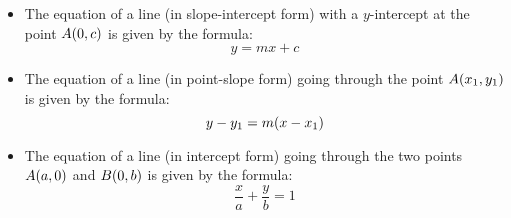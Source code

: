 \documentclass[12pt,a4paper,titlepage]{article}
\DeclarePairedDelimiter {\pars}  {  (      }     {  )      }
\begin{document}
\begin{SummaryBox}[title=Linear coordinate geometry, breakable]
                \begin{SummaryExtensionBox}[title=Equation of a line]
                    \begin{itemize}[leftmargin=*]
                        \item The equation of a line (in slope-intercept form) with a $y$-intercept at the point $A\pars*{0,c}$ is given by the formula:
                        \[
                            y = mx + c
                        \]
                        \item The equation of a line (in point-slope form) going through the point $A\pars*{x_1,y_1}$ is given by the formula:
                        \[
                            y - y_1 = m\pars*{x-x_1}
                        \]
                        \item The equation of a line (in intercept form) going through the two points $A\pars*{a,0}$ and $B\pars*{0,b}$ is given by the formula:
                        \[
                            \frac{x}{a} + \frac{y}{b} = 1
                        \]
                    \end{itemize}
                \end{SummaryExtensionBox}
                

\end{SummaryBox}
\end{document}
